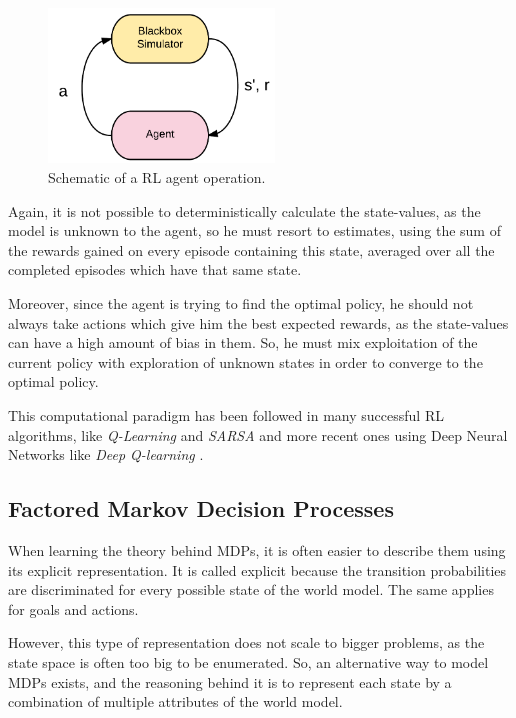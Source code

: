 \begin{figure}[H]
    \centering
        \includegraphics[width=6cm]{images/MCL-model}
        \caption{Schematic of a \gls{RL} agent operation.}
        \label{fig:mcl_agent}
\end{figure}

Again, it is not possible to deterministically calculate the state-values, as
the model is unknown to the agent, so he must resort to estimates, using the sum
of the rewards gained on every episode containing this state, averaged over
all the completed episodes which have that same state.

Moreover, since the agent is trying to find the optimal policy, he should not always
take actions which give him the best expected rewards, as the state-values can
have a high amount of bias in them. So, he must mix exploitation of the current
policy with exploration of unknown states in order to converge to the optimal
policy.

This computational paradigm has been
followed in many successful \gls{RL} algorithms, like \textit{Q-Learning} and
\textit{SARSA} \cite{Sutton1998} and more recent ones using Deep Neural Networks
like \textit{Deep Q-learning} \cite{mnih2015human} \cite{mnih2013playing}.

\subsection{Factored Markov Decision Processes}
When learning the theory behind \glspl{MDP}, it is often easier to describe
them using its explicit representation. It is called explicit because the
transition probabilities are discriminated for every possible state
of the world model. The same applies for goals and actions.

However, this type of representation does not scale to bigger problems, as the
state space is often too big to be enumerated.
So, an alternative way to model \glspl{MDP} exists, and the reasoning behind it
is to represent each state by a combination of multiple attributes of the world
model.

